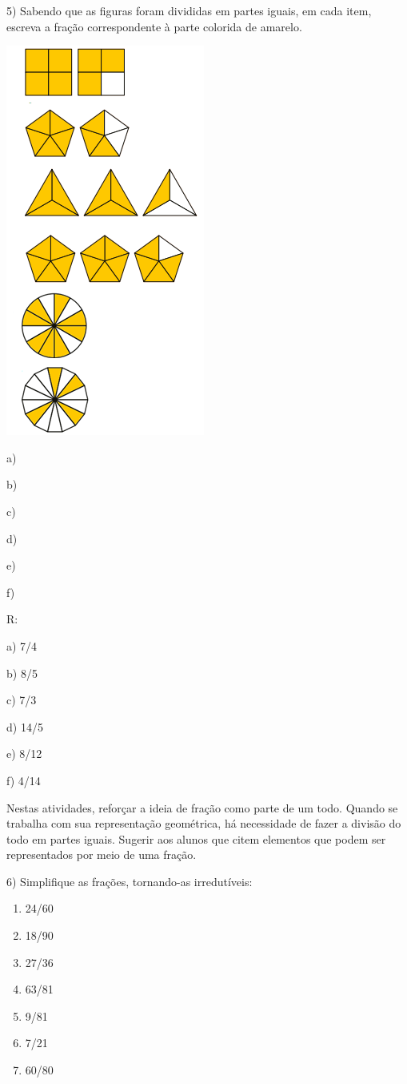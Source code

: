 5) Sabendo que as figuras foram divididas em partes iguais, em cada
item, escreva a fração correspondente à parte colorida de amarelo.

\includegraphics[width=2.57292in,height=5.0625in]{./imgSAEB_6_MAT/media/image32.png}

a)

b)

c)

d)

e)

f)

R:

a) 7/4

b) 8/5

c) 7/3

d) 14/5

e) 8/12

f) 4/14

Nestas atividades, reforçar a ideia de fração como parte de um todo.
Quando se trabalha com sua representação geométrica, há necessidade de
fazer a divisão do todo em partes iguais. Sugerir aos alunos que citem
elementos que podem ser representados por meio de uma fração.

6) Simplifique as frações, tornando-as irredutíveis:

\begin{enumerate}
\def\labelenumi{\alph{enumi})}
\item
  24/60
\item
  18/90
\item
  27/36
\item
  63/81
\item
  9/81
\item
  7/21
\item
  60/80
\end{enumerate}

